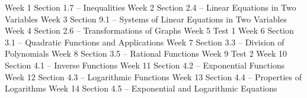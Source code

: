 \documentclass{osucourse}
\begin{document}
\begin{TopicsOutline}
Week 1         Section 1.7 – Inequalities
Week 2         Section 2.4 – Linear Equations in Two Variables
Week 3         Section 9.1 – Systems of Linear Equations in Two Variables
Week 4         Section 2.6 – Transformations of Graphs
Week 5         Test 1
Week 6         Section 3.1 – Quadratic Functions and Applications
Week 7         Section 3.3 – Division of Polynomials
Week 8         Section 3.5 – Rational Functions
Week 9         Test 2
Week 10        Section 4.1 – Inverse Functions
Week 11        Section 4.2 – Exponential Functions
Week 12        Section 4.3 – Logarithmic Functions
Week 13        Section 4.4 – Properties of Logarithms
Week 14        Section 4.5 – Exponential and Logarithmic Equations
\end{TopicsOutline}
\end{document}

